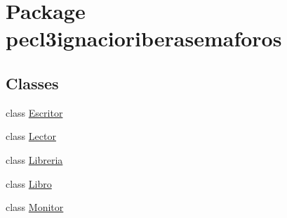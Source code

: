 \hypertarget{namespacepecl3ignacioriberasemaforos}{}\section{Package pecl3ignacioriberasemaforos}
\label{namespacepecl3ignacioriberasemaforos}
\subsection*{Classes}
\begin{DoxyCompactItemize}
\item 
class \mbox{\hyperlink{classpecl3ignacioriberasemaforos_1_1_escritor}{Escritor}}
\item 
class \mbox{\hyperlink{classpecl3ignacioriberasemaforos_1_1_lector}{Lector}}
\item 
class \mbox{\hyperlink{classpecl3ignacioriberasemaforos_1_1_libreria}{Libreria}}
\item 
class \mbox{\hyperlink{classpecl3ignacioriberasemaforos_1_1_libro}{Libro}}
\item 
class \mbox{\hyperlink{classpecl3ignacioriberasemaforos_1_1_monitor}{Monitor}}
\end{DoxyCompactItemize}
